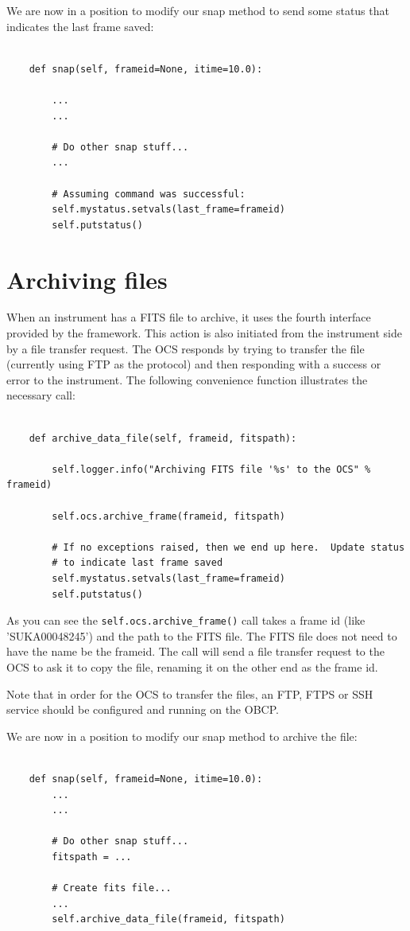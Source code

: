 \documentclass[11pt]{report}
\begin{document}
We are now in a position to modify our snap method to send some status
that indicates the last frame saved: 
\begin{verbatim}

    def snap(self, frameid=None, itime=10.0):

        ...
        ...

        # Do other snap stuff...
        ...

        # Assuming command was successful:
        self.mystatus.setvals(last_frame=frameid)
        self.putstatus()

\end{verbatim}

\section{Archiving files}
When an instrument has a FITS file to archive, it uses the fourth
interface provided by the framework. This action is also initiated from
the instrument side by a file transfer request. The OCS responds by
trying to transfer the file (currently using FTP as the protocol) and
then responding with a success or error to the instrument. The following
convenience function illustrates the necessary call: 
\begin{verbatim}

    def archive_data_file(self, frameid, fitspath):

        self.logger.info("Archiving FITS file '%s' to the OCS" % frameid)

        self.ocs.archive_frame(frameid, fitspath)

        # If no exceptions raised, then we end up here.  Update status
        # to indicate last frame saved
        self.mystatus.setvals(last_frame=frameid)
        self.putstatus()

\end{verbatim}
As you can see the {\tt self.ocs.archive\_frame()} call takes a frame id (like
'SUKA00048245') and the path to the FITS file. The FITS file does not
need to have the name be the frameid. The call will send a file transfer
request to the OCS to ask it to copy the file, renaming it on the other
end as the frame id. 

Note that in order for the OCS to transfer the files, an FTP, FTPS or
SSH service should be configured and running on the OBCP.   

We are now in a position to modify our snap method to archive the file:
\begin{verbatim}

    def snap(self, frameid=None, itime=10.0):
        ...
        ...

        # Do other snap stuff...
        fitspath = ...

        # Create fits file...
        ...
        self.archive_data_file(frameid, fitspath)

\end{verbatim}
\end{document}
